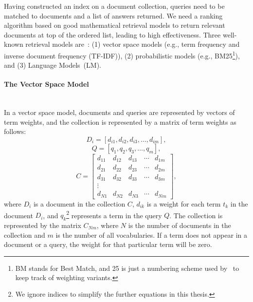 Having constructed an index on a document collection, queries need to 
be matched to documents and a list of answers returned. We need a ranking algorithm based on good mathematical retrieval models to 
return relevant documents at top of the ordered list, leading to high effectiveness. 
Three well-known retrieval models are~\citep[p. 233]{croft2010search}: (1) vector space models (e.g., term frequency and inverse document frequency (TF-IDF)), (2) probabilistic models (e.g., BM25\footnote{BM stands for Best Match, and 25 is just a numbering scheme used by~\cite{robertson1994some} to keep track of weighting variants.}), and (3) Language Models~(LM). 

\paragraph{The Vector Space Model}
\ \\
In a vector space model, documents and queries are represented by vectors of term weights, and the collection is represented by a matrix of term weights as follows: 
\begin{displaymath} 
D_{i}=[d_{i1}, d_{i2}, d_{i3}, \ldots , d_{im}],
\end{displaymath}
\begin{displaymath} 
Q=[q_{1}, q_{2}, q_{3}, \ldots , q_{m}],
\end{displaymath}
\begin{displaymath} 
C=
\begin{bmatrix}
        d_{11} & d_{12} & d_{13} & \cdots & d_{1m}\\
        d_{21} & d_{22} & d_{23} & \cdots & d_{2m}\\
        d_{31} & d_{32} & d_{33} & \cdots & d_{3m}\\
        \vdots\\
        d_{N1} & d_{N2} & d_{N3} & \cdots & d_{Nm}
     \end{bmatrix},
\end{displaymath}
\noindent
where $ D_{i} $ is a document in the collection $ C $, $ d_{ik} $ is a weight for each term $ t_{k} $ in the document $ D_{i} $, and $ q_{k} $\footnote{We ignore indices to simplify the further equations in this thesis.} represents a term in the query $ Q $. The collection is represented by the matrix $C_{Nm}$, where $N$ is the number of documents in the collection and $m$ is the number of all vocabularies. If a term does not appear in a document or a query, the weight for that particular term will be zero. 

